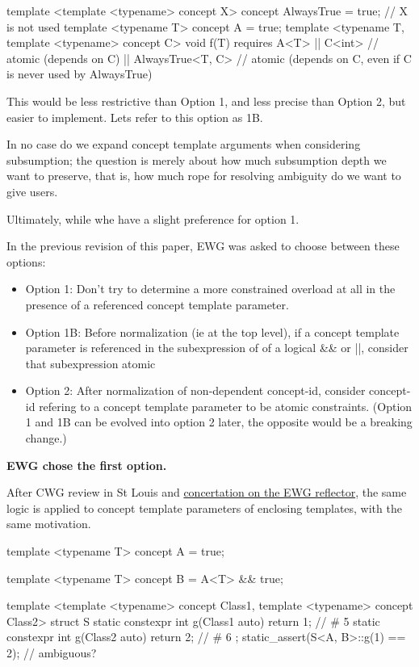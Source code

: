 \documentclass{wg21}
\begin{document}
\begin{colorblock}
template <template <typename> concept X>
concept AlwaysTrue = true; // X is not used
template <typename T>
concept A = true;
template <typename T, template <typename> concept C>
void f(T) requires
A<T>
|| C<int>  // atomic (depends on C)
|| AlwaysTrue<T, C> {}  // atomic (depends on C, even if C is never used by AlwaysTrue)
\end{colorblock}

This would be less restrictive than Option 1, and less precise than Option 2, but easier to implement.
Lets refer to this option as 1B.

In no case do we expand concept template arguments when considering subsumption; the question is merely about how much subsumption depth we want to preserve, that is, how much rope for resolving ambiguity do we want to give users.

Ultimately, while whe have a slight preference for option 1.

In the previous revision of this paper, EWG was asked to choose between these options:

\begin{itemize}
\item Option  1: Don't try to determine a more constrained overload at all in the presence of a referenced concept template parameter.
\item Option 1B: Before normalization (ie at the top level), if a concept template parameter is referenced in the subexpression of of a logical \&\& or ||, consider that subexpression atomic
\item Option 2:  After normalization of non-dependent concept-id, consider concept-id refering to a concept template parameter to be atomic constraints.
(Option 1 and 1B can be evolved into option 2 later, the opposite would be a breaking change.)
\end{itemize}

\textbf{EWG chose the first option.}

After CWG review in St Louis and \href{https://lists.isocpp.org/ext/2024/10/23412.php}{concertation on the EWG reflector}, the same logic is applied to
concept template parameters of enclosing templates, with the same motivation.

\begin{colorblock}
template <typename T>
concept A = true;

template <typename T>
concept B = A<T> && true;

template <template <typename> concept Class1,
          template <typename> concept Class2>
struct S {
     static constexpr int g(Class1 auto) {return 1;} // # 5
     static constexpr int g(Class2 auto) {return 2;} // # 6
};
static_assert(S<A, B>::g(1) == 2); // ambiguous?
\end{colorblock}
\end{document}
